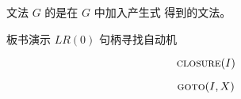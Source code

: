 \begin{frame}{}
  \begin{center}
    \begin{definition}
      文法 $G$ 的是在 $G$ 中加入产生式  得到的文法。
    \end{definition}
  \end{center}
\end{frame}

\begin{frame}{}
  \begin{center}
    板书演示 $LR(0)$ 句柄寻找自动机
  \end{center}
\end{frame}

\begin{frame}{}
  \begin{center}
    \[
      \textsc{closure}(I)
    \]

    \[
      \textsc{goto}(I, X)
    \]
  \end{center}
\end{frame}

\begin{frame}{}
\end{frame}
